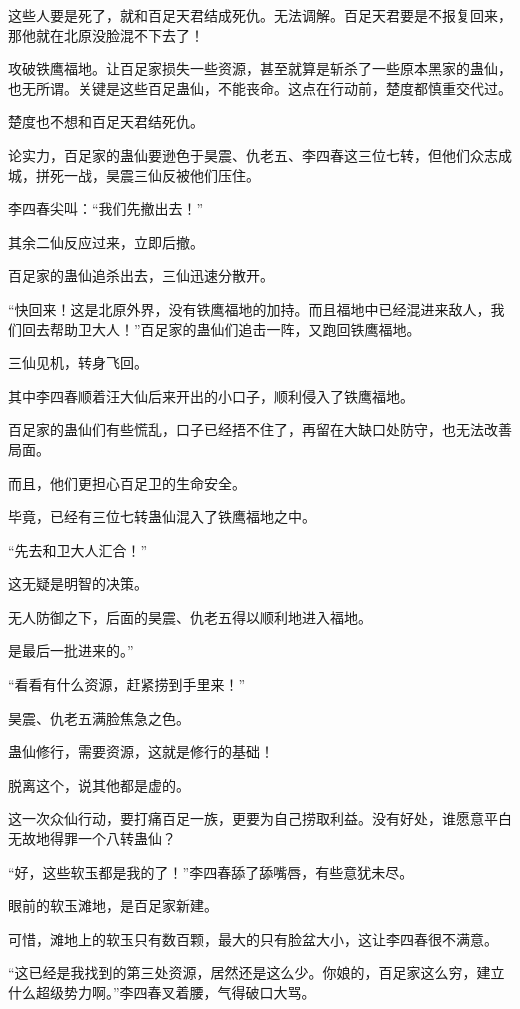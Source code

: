 \begin{this_body}
这些人要是死了，就和百足天君结成死仇。无法调解。百足天君要是不报复回来，那他就在北原没脸混不下去了！

攻破铁鹰福地。让百足家损失一些资源，甚至就算是斩杀了一些原本黑家的蛊仙，也无所谓。关键是这些百足蛊仙，不能丧命。这点在行动前，楚度都慎重交代过。

楚度也不想和百足天君结死仇。

论实力，百足家的蛊仙要逊色于昊震、仇老五、李四春这三位七转，但他们众志成城，拼死一战，昊震三仙反被他们压住。

李四春尖叫：“我们先撤出去！”

其余二仙反应过来，立即后撤。

百足家的蛊仙追杀出去，三仙迅速分散开。

“快回来！这是北原外界，没有铁鹰福地的加持。而且福地中已经混进来敌人，我们回去帮助卫大人！”百足家的蛊仙们追击一阵，又跑回铁鹰福地。

三仙见机，转身飞回。

其中李四春顺着汪大仙后来开出的小口子，顺利侵入了铁鹰福地。

百足家的蛊仙们有些慌乱，口子已经捂不住了，再留在大缺口处防守，也无法改善局面。

而且，他们更担心百足卫的生命安全。

毕竟，已经有三位七转蛊仙混入了铁鹰福地之中。

“先去和卫大人汇合！”

这无疑是明智的决策。

无人防御之下，后面的昊震、仇老五得以顺利地进入福地。

是最后一批进来的。”

“看看有什么资源，赶紧捞到手里来！”

昊震、仇老五满脸焦急之色。

蛊仙修行，需要资源，这就是修行的基础！

脱离这个，说其他都是虚的。

这一次众仙行动，要打痛百足一族，更要为自己捞取利益。没有好处，谁愿意平白无故地得罪一个八转蛊仙？

“好，这些软玉都是我的了！”李四春舔了舔嘴唇，有些意犹未尽。

眼前的软玉滩地，是百足家新建。

可惜，滩地上的软玉只有数百颗，最大的只有脸盆大小，这让李四春很不满意。

“这已经是我找到的第三处资源，居然还是这么少。你娘的，百足家这么穷，建立什么超级势力啊。”李四春叉着腰，气得破口大骂。


\end{this_body}
